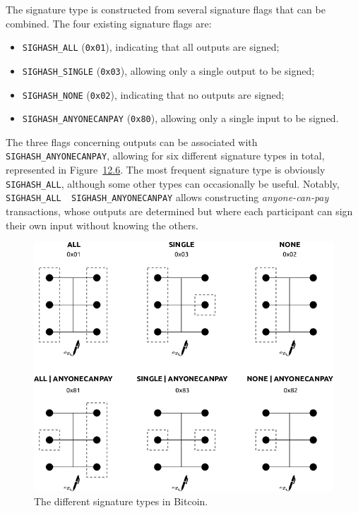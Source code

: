 \documentclass[
  a5paper,
  smalldemyvopaper,10pt,twoside,onecolumn,openright,extrafontsizes,hidelinks]{memoir}
\providecommand{\tightlist}{%
  \setlength{\itemsep}{0pt}\setlength{\parskip}{0pt}}\usepackage{longtable,booktabs,array}
\begin{document}
The signature type is constructed from several signature flags that can
be combined. The four existing signature flags are:

\begin{itemize}
\tightlist
\item
  \texttt{SIGHASH\_ALL} (\texttt{0x01}), indicating that all outputs are
  signed;
\item
  \texttt{SIGHASH\_SINGLE} (\texttt{0x03}), allowing only a single
  output to be signed;
\item
  \texttt{SIGHASH\_NONE} (\texttt{0x02}), indicating that no outputs are
  signed;
\item
  \texttt{SIGHASH\_ANYONECANPAY} (\texttt{0x80}), allowing only a single
  input to be signed.
\end{itemize}

The three flags concerning outputs can be associated with
\texttt{SIGHASH\_ANYONECANPAY}, allowing for six different signature
types in total, represented in
Figure~\hyperref[fig:signature-hash-types]{12.6}. The most frequent
signature type is obviously \texttt{SIGHASH\_ALL}, although some other
types can occasionally be useful. Notably,
\texttt{SIGHASH\_ALL\ \textbar{}\ SIGHASH\_ANYONECANPAY} allows
constructing \emph{anyone-can-pay} transactions, whose outputs are
determined but where each participant can sign their own input without
knowing the others.

\begin{figure}

{\centering \includegraphics{chapters/img/signature-hash-types.png}

}

\caption{The different signature types in Bitcoin.}

\end{figure}%
\end{document}
